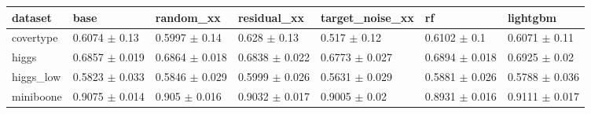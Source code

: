 \begin{tabular}{lllllll}
\toprule
dataset & base & random\_xx & residual\_xx & target\_noise\_xx & rf & lightgbm \\
\midrule
covertype & 0.6074 $\pm$ 0.13 & 0.5997 $\pm$ 0.14 & 0.628 $\pm$ 0.13 & 0.517 $\pm$ 0.12 & 0.6102 $\pm$ 0.1 & 0.6071 $\pm$ 0.11 \\
higgs & 0.6857 $\pm$ 0.019 & 0.6864 $\pm$ 0.018 & 0.6838 $\pm$ 0.022 & 0.6773 $\pm$ 0.027 & 0.6894 $\pm$ 0.018 & 0.6925 $\pm$ 0.02 \\
higgs\_low & 0.5823 $\pm$ 0.033 & 0.5846 $\pm$ 0.029 & 0.5999 $\pm$ 0.026 & 0.5631 $\pm$ 0.029 & 0.5881 $\pm$ 0.026 & 0.5788 $\pm$ 0.036 \\
miniboone & 0.9075 $\pm$ 0.014 & 0.905 $\pm$ 0.016 & 0.9032 $\pm$ 0.017 & 0.9005 $\pm$ 0.02 & 0.8931 $\pm$ 0.016 & 0.9111 $\pm$ 0.017 \\
\bottomrule
\end{tabular}
